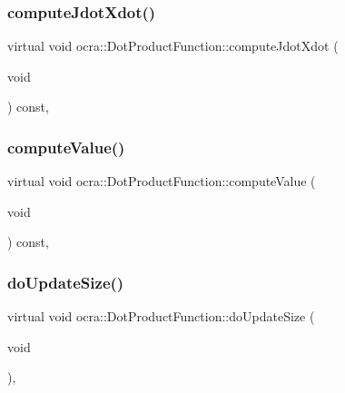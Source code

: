 \hypertarget{classocra_1_1DotProductFunction_a07f6a0a7e676a8849732f3469d70bcae}{}\label{classocra_1_1DotProductFunction_a07f6a0a7e676a8849732f3469d70bcae} 
\subsubsection{\texorpdfstring{compute\+Jdot\+Xdot()}{computeJdotXdot()}}
{\footnotesize\ttfamily virtual void ocra\+::\+Dot\+Product\+Function\+::compute\+Jdot\+Xdot (\begin{DoxyParamCaption}\item[{void}]{ }\end{DoxyParamCaption}) const\hspace{0.3cm}{\ttfamily [protected]}, {\ttfamily [virtual]}}

\hypertarget{classocra_1_1DotProductFunction_ac0dcd9911e638ebcd8e9594dbf0fa9ed}{}\label{classocra_1_1DotProductFunction_ac0dcd9911e638ebcd8e9594dbf0fa9ed} 
\subsubsection{\texorpdfstring{compute\+Value()}{computeValue()}}
{\footnotesize\ttfamily virtual void ocra\+::\+Dot\+Product\+Function\+::compute\+Value (\begin{DoxyParamCaption}\item[{void}]{ }\end{DoxyParamCaption}) const\hspace{0.3cm}{\ttfamily [protected]}, {\ttfamily [virtual]}}

\hypertarget{classocra_1_1DotProductFunction_af943f9e456e44b3cbe108a964697f239}{}\label{classocra_1_1DotProductFunction_af943f9e456e44b3cbe108a964697f239} 
\subsubsection{\texorpdfstring{do\+Update\+Size()}{doUpdateSize()}}
{\footnotesize\ttfamily virtual void ocra\+::\+Dot\+Product\+Function\+::do\+Update\+Size (\begin{DoxyParamCaption}\item[{void}]{ }\end{DoxyParamCaption})\hspace{0.3cm}{\ttfamily [protected]}, {\ttfamily [virtual]}}



